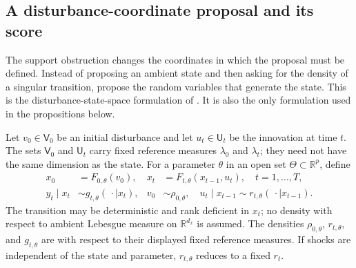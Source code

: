\documentclass[11pt]{article}
\newcommand{\R}{\mathbb{R}}
\begin{document}
\subsection{A disturbance-coordinate proposal and its score}
\label{sec:disturbance-proposal}

The support obstruction changes the coordinates in which the proposal must be
defined. Instead of proposing an ambient state and then asking for the density
of a singular transition, propose the random variables that generate the
state. This is the disturbance-state-space formulation of
\citet[Sections 2--3]{murray2018disturbance}. It is also the only formulation
used in the propositions below.

Let $v_0\in\mathsf V_0$ be an initial disturbance and let
$u_t\in\mathsf U_t$ be the innovation at time $t$. The sets
$\mathsf V_0$ and $\mathsf U_t$ carry fixed reference measures
$\lambda_0$ and $\lambda_t$; they need not have the same dimension as the
state. For a parameter $\theta$ in an open set $\Theta\subset\R^p$, define
\begin{align}
 x_0&=F_{0,\theta}(v_0), &
 x_t&=F_{t,\theta}(x_{t-1},u_t), \quad t=1,\ldots,T, 
 \label{eq:disturbance-state-map}\\
 y_t\mid x_t&\sim g_{t,\theta}(\,\cdot\mid x_t), &
 v_0&\sim\rho_{0,\theta}, \quad
 u_t\mid x_{t-1}\sim r_{t,\theta}(\,\cdot\mid x_{t-1}).
 \label{eq:disturbance-model}
\end{align}
The transition may be deterministic and rank deficient in $x_t$; no density
with respect to ambient Lebesgue measure on $\R^{d_x}$ is assumed. The
densities $\rho_{0,\theta}$, $r_{t,\theta}$, and $g_{t,\theta}$ are with
respect to their displayed fixed reference measures. If shocks are independent
of the state and parameter, $r_{t,\theta}$ reduces to a fixed $r_t$.
\end{document}
